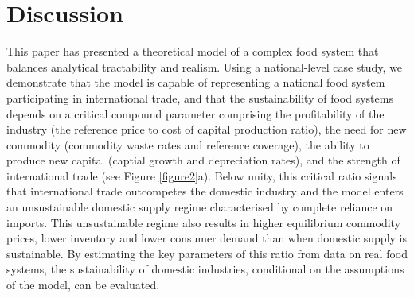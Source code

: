 \documentclass[12pt]{article}
\begin{document}
\section{Discussion}
This paper has presented a theoretical model of a complex food system that balances analytical tractability and realism. 
Using a national-level case study, we demonstrate that the model is capable of representing 
a national food system participating in international trade, 
and that the sustainability of food systems depends on a critical compound parameter  
comprising the profitability of the industry (the reference price to cost of capital production ratio), 
the need for new commodity (commodity waste rates and reference coverage), 
the ability to produce new capital (captial growth and depreciation rates), 
and the strength of international trade (see Figure \ref{figure2}a). 
Below unity, this critical ratio signals that international trade outcompetes the domestic industry 
and the model enters an unsustainable domestic supply regime characterised by complete reliance on imports. 
This unsustainable regime also results in higher equilibrium commodity prices, lower inventory and lower consumer demand 
than when domestic supply is sustainable. By estimating the key parameters of this ratio from data on real food systems, 
the sustainability of domestic industries, conditional on the assumptions of the model, can be evaluated.
\end{document}
